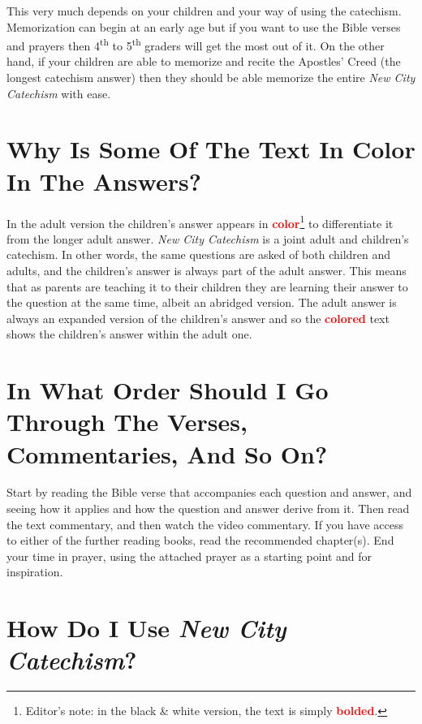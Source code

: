 \documentclass[]{memoir}
\newcommand\Children[1]{\textbf{\textcolor{red}{#1}}}
\begin{document}
This very much depends on your children and your way of using the catechism. Memorization can begin at an early age but if you want to use the Bible verses and prayers then 4\textsuperscript{th} to 5\textsuperscript{th} graders will get the most out of it. On the other hand, if your children are able to memorize and recite the Apostles' Creed (the longest catechism answer) then they should be able memorize the entire \emph{New City Catechism}\/ with ease.

\section[Why Is Some Of The Text In Color In The Answers?][Why Is Some Of The Text In Color?]{Why Is Some Of The Text In Color In The Answers?}

In the adult version the children's answer appears in \Children{color}\footnote{Editor's note: in the black \& white version, the text is simply \Children{bolded}.} to differentiate it from the longer adult answer. \emph{New City Catechism}\/ is a joint adult and children's catechism. In other words, the same questions are asked of both children and adults, and the children's answer is always part of the adult answer. This means that as parents are teaching it to their children they are learning their answer to the question at the same time, albeit an abridged version. The adult answer is always an expanded version of the children's answer and so the \Children{colored} text shows the children's answer within the adult one.

\section[In What Order Should I Go Through The Verses, Commentaries, And So On?][Use Of The Additional Resources]{In What Order Should I Go Through The Verses, Commentaries, And So On?}

Start by reading the Bible verse that accompanies each question and answer, and seeing how it applies and how the question and answer derive from it. Then read the text commentary, and then watch the video commentary. If you have access to either of the further reading books, read the recommended chapter(s). End your time in prayer, using the attached prayer as a starting point and for inspiration.

\section[How Do I Use {\em New City Catechism}?][How To Use {\em New City Catechism}]{How Do I Use {\em New City Catechism}?}
\end{document}
